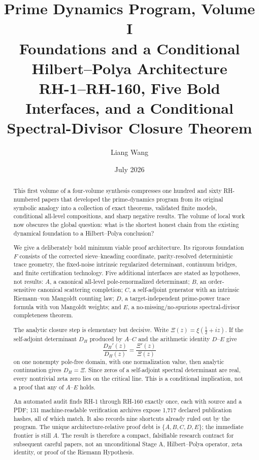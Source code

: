\documentclass[11pt]{article}
\title{\textbf{Prime Dynamics Program, Volume I}\\
\Large Foundations and a Conditional Hilbert--Polya Architecture\\
\large RH-1--RH-160, Five Bold Interfaces, and a Conditional Spectral-Divisor Closure Theorem}
\author{Liang Wang}
\date{July 2026}
\theoremstyle{definition}
\theoremstyle{remark}
\begin{document}
\maketitle

\begin{abstract}
This first volume of a four-volume synthesis compresses one hundred and sixty
RH-numbered papers that developed the prime-dynamics
program from its original symbolic analogy into a collection of exact
theorems, validated finite models, conditional all-level compositions, and
sharp negative results.  The volume of local work now obscures the global
question: what is the shortest honest chain from the existing dynamical
foundation to a Hilbert--Polya conclusion?

We give a deliberately bold minimum viable proof architecture.  Its rigorous
foundation $F$ consists of the corrected sieve--kneading coordinate,
parity-resolved deterministic trace geometry, the fixed-noise intrinsic
regularized determinant, continuum bridges, and finite certification
technology.  Five additional interfaces are stated as hypotheses, not
results: $A$, a canonical all-level pole-renormalized determinant; $B$, an
order-sensitive canonical scattering completion; $C$, a self-adjoint
generator with an intrinsic Riemann--von Mangoldt counting law; $D$, a
target-independent prime-power trace formula with von Mangoldt weights; and
$E$, a no-missing/no-spurious spectral-divisor completeness theorem.

The analytic closure step is elementary but decisive.  Write
$\Xi(z)=\xi(\tfrac12+iz)$.  If the self-adjoint determinant $D_H$ produced by
$A$--$C$ and the arithmetic identity $D$--$E$ give
\[
  \frac{D_H'(z)}{D_H(z)}=\frac{\Xi'(z)}{\Xi(z)}
\]
on one nonempty pole-free domain, with one normalization value, then analytic
continuation gives $D_H=\Xi$.  Since zeros of a self-adjoint spectral
determinant are real, every nontrivial zeta zero lies on the critical line.
This is a conditional implication, not a proof that any of $A$--$E$ holds.

An automated audit finds RH-1 through RH-160 exactly once, each with source
and a PDF; 131 machine-readable verification archives expose 1,717 declared
publication hashes, all of which match.  It also records nine shortcuts
already ruled out by the program.  The unique architecture-relative proof
debt is $\{A,B,C,D,E\}$; the immediate frontier is still $A$.  The result is
therefore a compact, falsifiable research contract for subsequent careful
papers, not an unconditional Stage A, Hilbert--Polya operator, zeta identity,
or proof of the Riemann Hypothesis.
\end{abstract}
\end{document}
